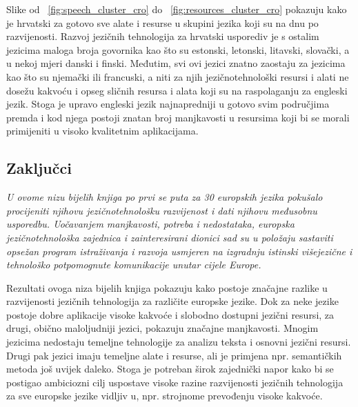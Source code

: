 \begin{multicols}{2}
\columnbreak
Slike od ~\ref{fig:speech_cluster_cro} do ~\ref{fig:resources_cluster_cro} pokazuju kako je hrvatski za gotovo sve alate i resurse u skupini jezika koji su na dnu po razvijenosti. Razvoj jezičnih tehnologija za hrvatski usporediv je s ostalim jezicima maloga broja govornika kao što su estonski, letonski, litavski, slovački, a u nekoj mjeri danski i finski. Međutim, svi ovi jezici znatno zaostaju za jezicima kao što su njemački ili francuski, a niti za njih jezičnotehnološki resursi i alati ne dosežu kakvoću i opseg sličnih resursa i alata koji su na raspolaganju za engleski jezik. Stoga je upravo engleski jezik najnapredniji u gotovo svim područjima premda i kod njega postoji znatan broj manjkavosti u resursima koji bi se morali primijeniti u visoko kvalitetnim aplikacijama.
\vfill

\subsection{Zaključci}

\emph{U ovome nizu bijelih knjiga po prvi se puta za 30 europskih jezika pokušalo procijeniti njihovu jezičnotehnološku razvijenost i dati njihovu međusobnu usporedbu. Uočavanjem manjkavosti, potreba i nedostataka, europska jezičnotehnološka zajednica i zainteresirani dionici sad su u položaju sastaviti opsežan program istraživanja i razvoja usmjeren na izgradnju istinski višejezične i tehnološko potpomognute komunikacije unutar cijele Europe.}

Rezultati ovoga niza bijelih knjiga pokazuju kako postoje značajne razlike u razvijenosti jezičnih tehnologija za različite europske jezike. Dok za neke jezike postoje dobre aplikacije visoke kakvoće i slobodno dostupni jezični resursi, za drugi, obično maloljudniji jezici, pokazuju značajne manjkavosti. Mnogim jezicima nedostaju temeljne tehnologije za analizu teksta i osnovni jezični resursi. Drugi pak jezici imaju temeljne alate i resurse, ali je primjena npr. semantičkih metoda još uvijek daleko. Stoga je potreban širok zajednički napor kako bi se postigao ambiciozni cilj uspostave visoke razine razvijenosti jezičnih tehnologija za sve europske jezike vidljiv u, npr. strojnome prevođenju visoke kakvoće.


\end{multicols}
